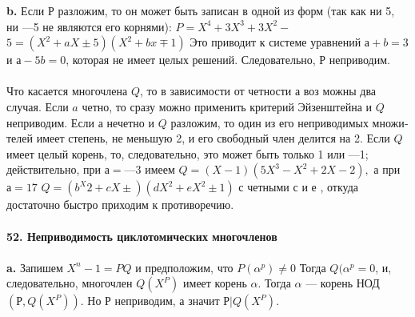 \documentclass{../../template/mai_book}
\begin{document}
{{\hspace*{15pt}\textbf{b.} Если $Р$ разложим, то он может быть записан в одной из форм\linebreak
(так как ни 5, ни —5 не являются его корнями): $P = X^{4} + 3X^{3} + 3X^{2} -$\linebreak
$5 = (X^{2} + aX \pm 5)(X^{2} + bx \mp 1)$ Это приводит к системе уравнений \linebreak
$а + b = 3$ и $а - 5b = 0$, которая не имеет целых решений. Следовательно,\linebreak
$Р$ неприводим.\\
\\
\hspace*{15pt} Что касается многочлена $Q$, то в зависимости от четности а воз­
можны два случая. Если $a$ четно, то сразу можно применить критерий
Эйзенштейна и $Q$ неприводим.
\hspace*{0pt} Если а нечетно и $Q$ разложим, то один из его неприводимых множи­\linebreak
телей имеет степень, не меньшую 2, и его свободный член делится на 2.\linebreak
Если $Q$ имеет целый корень, то, следовательно, это может быть только 1\linebreak
или —1; действительно, при $а = —3$ имеем $Q = (X - 1)(5X^3 - X^2 + 2X - 2),$\linebreak
а при $а = 17$ $Q = (b^X{2} + cX \pm)(dX^{2} + eX^{2} \pm 1)$ с четными $с$ и $е$ , откуда\linebreak
достаточно быстро приходим к противоречию.\\
\\
\noindent\textbf{52. Неприводимость циклотомических многочленов}\\
\\
\hspace*{15pt}\textbf{a.} Запишем $X^{n} - 1 = PQ $ и предположим, что $P(\alpha^p) \neq 0$ Тогда\linebreak
$Q(\alpha^{p} = 0$, и, следовательно, многочлен $Q(X^{P})$ имеет корень $\alpha$. Тогда\linebreak
$\alpha$ ---  корень НОД$(Р, Q(X^{P}))$. Но $Р$ неприводим, а значит $Р | Q(X^{P})$.\\

}}
\end{document}
